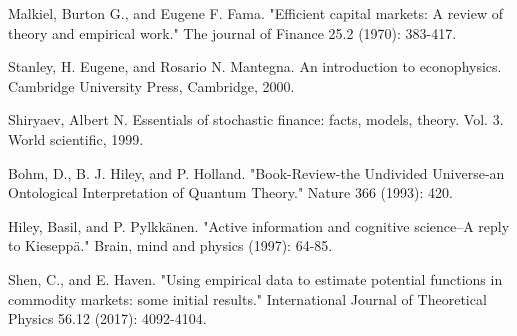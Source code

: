 \documentclass[a4paper,titlepage,12pt,fleqn,oneside]{report}
\begin{document}
\begin{thebibliography}{99}
\begin{LTRitems}
	Malkiel, Burton G., and Eugene F. Fama. "Efficient capital markets: A review of theory and empirical work." The journal of Finance 25.2 (1970): 383-417.
\end{LTRitems}

\begin{LTRitems}
	Stanley, H. Eugene, and Rosario N. Mantegna. An introduction to econophysics. Cambridge University Press, Cambridge, 2000.
\end{LTRitems}

\begin{LTRitems}
	Shiryaev, Albert N. Essentials of stochastic finance: facts, models, theory. Vol. 3. World scientific, 1999.
\end{LTRitems}

\begin{LTRitems}
	Bohm, D., B. J. Hiley, and P. Holland. "Book-Review-the Undivided Universe-an Ontological Interpretation of Quantum Theory." Nature 366 (1993): 420.	
\end{LTRitems}

\begin{LTRitems}
	Hiley, Basil, and P. Pylkkänen. "Active information and cognitive science–A reply to Kieseppä." Brain, mind and physics (1997): 64-85.
\end{LTRitems}


\begin{LTRitems}
	Shen, C., and E. Haven. "Using empirical data to estimate potential functions in commodity markets: some initial results." International Journal of Theoretical Physics 56.12 (2017): 4092-4104.
\end{LTRitems}

\begin{LTRitems}
	\bibitem{}
	
\end{LTRitems}

\begin{LTRitems}
	\bibitem{}
	
\end{LTRitems}

\begin{LTRitems}
	\bibitem{}
	
\end{LTRitems}

\begin{LTRitems}
	\bibitem{}
	
\end{LTRitems}

\begin{LTRitems}
	\bibitem{}
	
\end{LTRitems}

\begin{LTRitems}
	\bibitem{}
	
\end{LTRitems}



\end{thebibliography}
\end{document}
